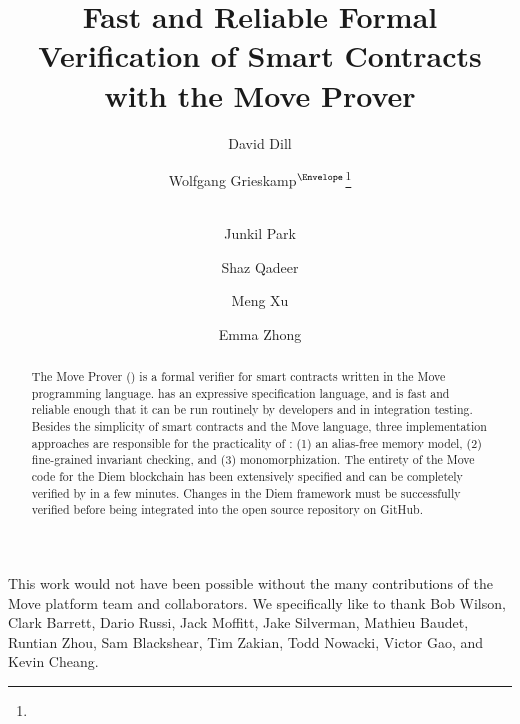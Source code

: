 \documentclass[runningheads,openbib]{llncs}
\begin{document}
\author{
  David Dill \and Wolfgang Grieskamp$^{\textrm{\Envelope}}$\thanks{\mailname {}} \and \\ Junkil
  Park \and Shaz Qadeer \and Meng Xu \and Emma Zhong
}


\title{Fast and Reliable Formal Verification of Smart Contracts with the Move Prover}

\maketitle
\begin{abstract}
  The Move Prover (\MVP) is a formal verifier for smart contracts written in the
  Move programming language. \MVP has an expressive specification language, and
  is fast and reliable enough that it can be run routinely by developers and in
  integration testing.  Besides the simplicity of smart contracts and the Move
  language, three implementation approaches are responsible for the practicality
  of \MVP: (1) an alias-free memory model, (2) fine-grained invariant checking,
  and (3) monomorphization.  The entirety of the Move code for the Diem
  blockchain has been extensively specified and can be completely verified by
  \MVP in a few minutes. Changes in the Diem framework must be successfully
  verified before being integrated into the open source repository on GitHub.
\end{abstract}









This work would not have been possible without the many contributions of the
Move platform team and collaborators.  We specifically like to thank Bob Wilson,
Clark Barrett, Dario Russi, Jack Moffitt, Jake Silverman, Mathieu Baudet,
Runtian Zhou, Sam Blackshear, Tim Zakian, Todd Nowacki, Victor Gao, and Kevin
Cheang.

\appendix
\newpage


\end{document}
